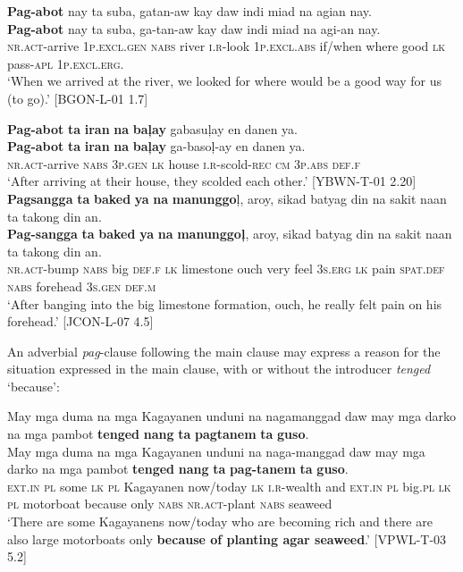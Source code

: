 \ea
\label{bkm:Ref474575743}
\textbf{Pag-abot}  nay  ta  suba,  gatan-aw  kay  daw  indi miad  na  agian  nay. \smallskip\\
\gll \textbf{Pag-abot}  nay  ta  suba,  ga-tan-aw  kay  daw  indi miad  na  agi-an  nay. \\
\textsc{nr.act}-arrive  1\textsc{p.excl.gen}  \textsc{nabs}  river  \textsc{i.r}-look  1\textsc{p.excl.abs}  if/when  where
good  \textsc{lk}  pass-\textsc{apl}  1\textsc{p.excl.erg}. \\
\glt `When we arrived at the river, we looked for where would be a good way for us (to go).’ [BGON-L-01 1.7]
\z

\ea
\textbf{Pag-abot}  \textbf{ta}  \textbf{iran}  \textbf{na}  \textbf{baļay}  gabasuļay  en  danen  ya. \smallskip\\
\gll \textbf{Pag-abot}  \textbf{ta}  \textbf{iran}  \textbf{na}  \textbf{baļay}  ga-basoļ-ay  en  danen  ya. \\
\textsc{nr.act}-arrive  \textsc{nabs}  3\textsc{p.gen}  \textsc{lk}  house  \textsc{i.r}-scold-\textsc{rec}  \textsc{cm}  3\textsc{p.abs}  \textsc{def.f} \\
\glt ‘After arriving at their house, they scolded each other.’ [YBWN-T-01 2.20]
\z
\ea
\label{bkm:Ref474575734}
\textbf{Pagsangga}  \textbf{ta}  \textbf{baked}  \textbf{ya}  \textbf{na}  \textbf{manunggo}ļ,  aroy,  sikad  batyag din  na  sakit  naan  ta  takong  din  an. \smallskip\\
\gll \textbf{Pag-sangga}  \textbf{ta}  \textbf{baked}  \textbf{ya}  \textbf{na}  \textbf{manunggoļ},  aroy,  sikad  batyag din  na  sakit  naan  ta  takong  din  an. \\
\textsc{nr.act}-bump  \textsc{nabs}  big  \textsc{def.f}  \textsc{lk}  limestone  ouch  very  feel
3\textsc{s.erg}  \textsc{lk}  pain  \textsc{spat.def}  \textsc{nabs}  forehead  3\textsc{s.gen}  \textsc{def.m} \\
\glt `After banging into the big limestone formation, ouch, he really felt pain on his forehead.’ [JCON-L-07 4.5]
\z

An adverbial \textit{pag}{}-clause following the main clause may express a reason for the situation expressed in the main clause, with or without the introducer \textit{tenged} ‘because’:

\ea
May  mga  duma  na  mga  Kagayanen  unduni  na  nagamanggad daw  may  mga  darko  na  mga  pambot  \textbf{tenged}  \textbf{nang}  \textbf{ta} \textbf{pagtanem}  \textbf{ta}  \textbf{guso}. \smallskip\\
\gll May  mga  duma  na  mga  Kagayanen  unduni  na  naga-manggad daw  may  mga  darko  na  mga  pambot  \textbf{tenged}  \textbf{nang}  \textbf{ta} \textbf{pag-tanem}  \textbf{ta}  \textbf{guso}. \\
\textsc{ext.in}  \textsc{pl}  some  \textsc{lk}  \textsc{pl}  Kagayanen  now/today  \textsc{lk}  \textsc{i.r}-wealth and  \textsc{ext.in}  \textsc{pl}  big.\textsc{pl}  \textsc{lk}  \textsc{pl}  motorboat  because  only  \textsc{nabs} \textsc{nr.act}-plant  \textsc{nabs}  seaweed \\
\glt ‘There are some  Kagayanens now/today who are becoming rich and there are also large motorboats only \textbf{because of planting agar seaweed}.’ [VPWL-T-03 5.2]
\z

